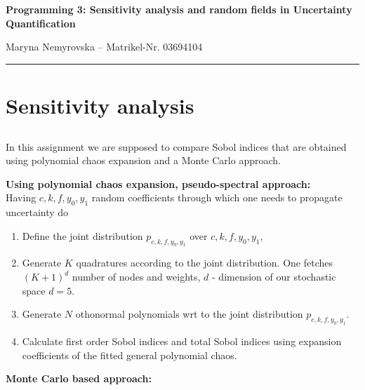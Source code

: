 \documentclass[11pt]{article}
\newcommand{\subass}{\subsection{}}
\newcommand{\hwhead}[4]{
\begin{center}
\sffamily\large\bfseries Programming 3: Sensitivity analysis and random fields in Uncertainty Quantification
\vspace{2mm} 
\normalfont

#2 -- #3 %
\end{center}
\vspace{6mm} \hrule \vspace{4mm}
}
\newcommand{\name}{Maryna Nemyrovska} %
\newcommand{\imat}{ Matrikel-Nr. 03694104} %
\begin{document}
\hwhead{xx}{\name}{\imat}{\email}


\section{Sensitivity analysis} 
\subass
In this assignment we are supposed to compare Sobol indices that are obtained using polynomial chaos expansion and a Monte Carlo approach.\par
\textbf{Using polynomial chaos expansion, pseudo-spectral approach:} \\
Having $c,k,f,y_0,y_1$ random coefficients through which one needs to propagate uncertainty do
\begin{enumerate}
    \item Define the joint distribution $p_{c,k,f,y_0,y_1}$ over ${c,k,f,y_0,y_1}$,
    \item Generate $K$ quadratures according to the joint distribution. One fetches $(K+1)^d$ number of nodes and weights, $d$ - dimension of our stochastic space $d=5$.
    \item Generate $N$ othonormal polynomials wrt to the joint distribution $p_{c,k,f,y_0,y_1}$.
    \item Calculate first order Sobol indices and total Sobol indices using expansion coefficients of the fitted general polynomial chaos.
\end{enumerate} \par
\textbf{Monte Carlo based approach:}
\end{document}
